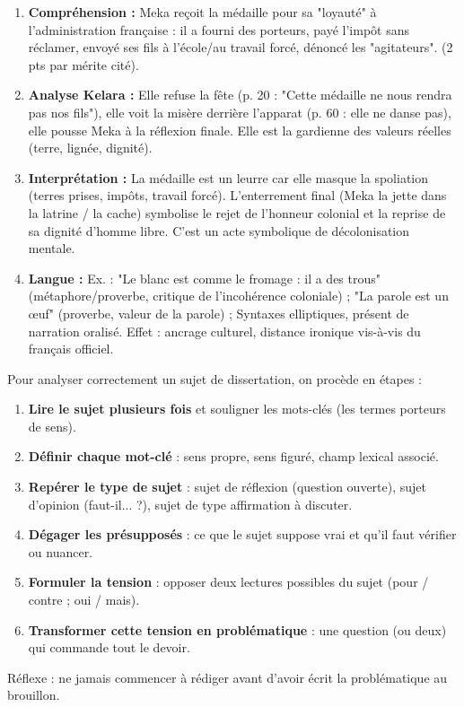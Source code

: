 \documentclass[11pt]{article}
\newcounter{popsec}
\newcounter{popsub}
\newcommand{\courssub}[1]{%
  \stepcounter{popsub}%
  \par\vspace{9pt}\noindent{\popxbold\fontsize{11.5}{13}\selectfont\color{popink}{\color{poporange}\thepopsec.\thepopsub}\hspace{6pt}#1}\par\nopagebreak\vspace{4pt}
}
\begin{document}
\begin{corrige}
\begin{enumerate}
\item \textbf{Compréhension :} Meka reçoit la médaille pour sa "loyauté" à l'administration française : il a fourni des porteurs, payé l'impôt sans réclamer, envoyé ses fils à l'école/au travail forcé, dénoncé les "agitateurs". (2 pts par mérite cité).
\item \textbf{Analyse Kelara :} Elle refuse la fête (p. 20 : "Cette médaille ne nous rendra pas nos fils"), elle voit la misère derrière l'apparat (p. 60 : elle ne danse pas), elle pousse Meka à la réflexion finale. Elle est la gardienne des valeurs réelles (terre, lignée, dignité).
\item \textbf{Interprétation :} La médaille est un leurre car elle masque la spoliation (terres prises, impôts, travail forcé). L'enterrement final (Meka la jette dans la latrine / la cache) symbolise le rejet de l'honneur colonial et la reprise de sa dignité d'homme libre. C'est un acte symbolique de décolonisation mentale.
\item \textbf{Langue :} Ex. : "Le blanc est comme le fromage : il a des trous" (métaphore/proverbe, critique de l'incohérence coloniale) ; "La parole est un œuf" (proverbe, valeur de la parole) ; Syntaxes elliptiques, présent de narration oralisé. Effet : ancrage culturel, distance ironique vis-à-vis du français officiel.
\end{enumerate}
\end{corrige}

\courssub{Analyser le sujet de dissertation}

\begin{methode}
Pour analyser correctement un sujet de dissertation, on procède en étapes :
\begin{enumerate}
\item \textbf{Lire le sujet plusieurs fois} et souligner les mots-clés (les termes porteurs de sens).
\item \textbf{Définir chaque mot-clé} : sens propre, sens figuré, champ lexical associé.
\item \textbf{Repérer le type de sujet} : sujet de réflexion (question ouverte), sujet d'opinion (faut-il... ?), sujet de type affirmation à discuter.
\item \textbf{Dégager les présupposés} : ce que le sujet suppose vrai et qu'il faut vérifier ou nuancer.
\item \textbf{Formuler la tension} : opposer deux lectures possibles du sujet (pour / contre ; oui / mais).
\item \textbf{Transformer cette tension en problématique} : une question (ou deux) qui commande tout le devoir.
\end{enumerate}
Réflexe : ne jamais commencer à rédiger avant d'avoir écrit la problématique au brouillon.
\end{methode}
\end{document}
